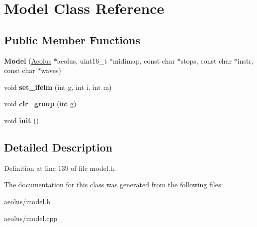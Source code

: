 \hypertarget{class_model}{}\section{Model Class Reference}
\label{class_model}
\subsection*{Public Member Functions}
\begin{DoxyCompactItemize}
\item 
\mbox{\label{class_model_ac6669a49c3b4e7dfc496cff5172cc4e7}} 
{\bfseries Model} (\hyperlink{class_aeolus}{Aeolus} $\ast$aeolus, uint16\+\_\+t $\ast$midimap, const char $\ast$stops, const char $\ast$instr, const char $\ast$waves)
\item 
\mbox{\label{class_model_a1255e081b898ec0ecd9bfb9e8a5aaf1a}} 
void {\bfseries set\+\_\+ifelm} (int g, int i, int m)
\item 
\mbox{\label{class_model_a08e585cea83c0c44d8dad84e2886c619}} 
void {\bfseries clr\+\_\+group} (int g)
\item 
\mbox{\label{class_model_a457ca5a6a659cbf6770231c98f2ef760}} 
void {\bfseries init} ()
\end{DoxyCompactItemize}


\subsection{Detailed Description}


Definition at line 139 of file model.\+h.



The documentation for this class was generated from the following files\+:\begin{DoxyCompactItemize}
\item 
aeolus/model.\+h\item 
aeolus/model.\+cpp\end{DoxyCompactItemize}

